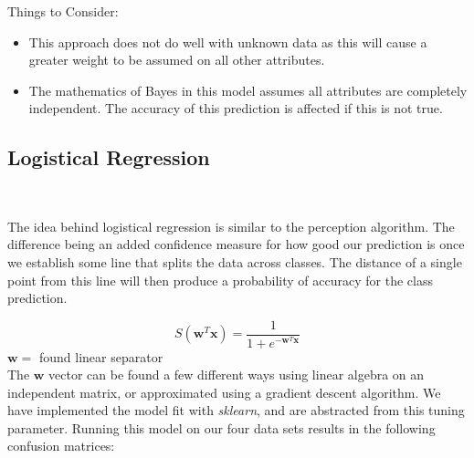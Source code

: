 \documentclass{article}
\begin{document}
		
		Things to Consider:
		\begin{itemize}
			\item This approach does not do well with unknown data as this will cause a greater weight to be assumed on all other attributes.
			\item The mathematics of Bayes in this model assumes all attributes are completely independent. The accuracy of this prediction is affected if this is not true.\\
		\end{itemize}
		
		
		\subsection{Logistical Regression}~
		
		The idea behind logistical regression is similar to the perception algorithm. The difference being an added confidence measure for how good our prediction is once we establish some line that splits the data across classes. The distance of a single point from this line will then produce a probability of accuracy for the class prediction.
		
		\begin{equation}
		S(\mathbf{w}^T\mathbf{x}) = \dfrac{1}{1+e^{-\mathbf{w}^T\mathbf{x}}}
		\end{equation}
		$ \mathbf{w} = $ found linear separator\\ 
		
		The $ \mathbf{w} $ vector can be found a few different ways using linear algebra on an independent matrix, or approximated using a gradient descent algorithm. We have implemented the model fit with \emph{sklearn}, and are abstracted from this tuning parameter. Running this model on our four data sets results in the following confusion matrices:
		
\end{document}
